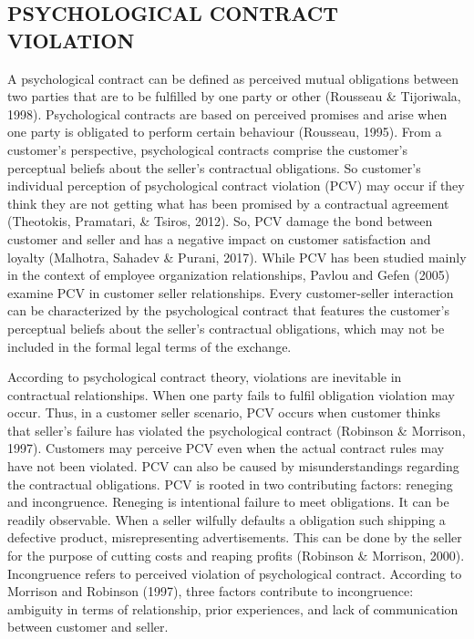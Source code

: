 \documentclass[a4paper, 12pt]{extarticle}
\begin{document}
{\subsection{PSYCHOLOGICAL CONTRACT VIOLATION}
\par A psychological contract can be defined as perceived mutual obligations between two parties that are to be fulfilled by one party or other (Rousseau \& Tijoriwala, 1998). Psychological contracts are based on perceived promises and arise when one party is obligated to perform certain behaviour (Rousseau, 1995). From a customer's perspective, psychological contracts comprise the customer's perceptual beliefs about the seller's contractual obligations. So customer's individual perception of psychological contract violation (PCV) may occur if they think they are not getting what has been promised by a contractual agreement (Theotokis, Pramatari, \& Tsiros, 2012). So, PCV damage the bond between customer and seller and has a negative impact on customer satisfaction and loyalty (Malhotra, Sahadev \& Purani, 2017). While PCV has been studied mainly in the context of employee organization relationships, Pavlou and Gefen (2005) examine PCV in customer seller relationships. Every customer-seller interaction can be characterized by the psychological contract that features the customer's perceptual beliefs about the seller's contractual obligations, which may not be included in the formal legal terms of the exchange.

\par According to psychological contract theory, violations are inevitable in contractual relationships. When one party fails to fulfil obligation violation may occur. Thus, in a customer seller scenario, PCV occurs when customer thinks that seller's failure has violated the psychological contract (Robinson \& Morrison, 1997). Customers may perceive PCV even when the actual contract rules may have not been violated. PCV can also be caused by misunderstandings regarding the contractual obligations. PCV is rooted in two contributing factors: reneging and incongruence. Reneging is intentional failure to meet obligations. It can be readily observable.  When a seller wilfully defaults a obligation such shipping a defective product, misrepresenting advertisements. This can be done by the seller for the purpose of cutting costs and reaping profits (Robinson \& Morrison, 2000).
Incongruence refers to perceived violation of psychological contract. According to Morrison and Robinson (1997), three factors contribute to incongruence: ambiguity in terms of relationship, prior experiences, and lack of communication between customer and seller.
}
\end{document}
